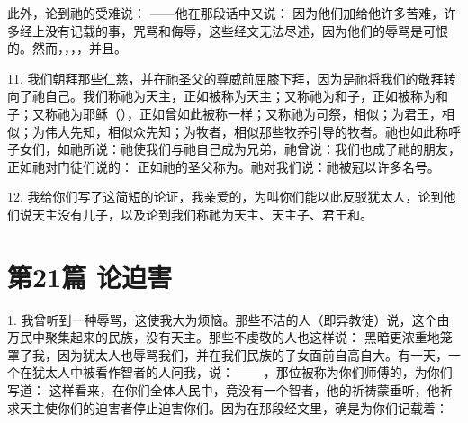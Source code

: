 此外，论到祂的受难说： ——他在那段话中又说： 因为他们加给他许多苦难，许多经上没有记载的事，咒骂和侮辱，这些经文无法尽述，因为他们的辱骂是可恨的。然而，，，，并且。\par

11. 我们朝拜那些仁慈，并在祂圣父的尊威前屈膝下拜，因为是祂将我们的敬拜转向了祂自己。我们称祂为天主，正如被称为天主；又称祂为和子，正如被称为和子；又称祂为耶稣（），正如曾如此被称一样；又称祂为司祭，相似；为君王，相似；为伟大先知，相似众先知；为牧者，相似那些牧养引导的牧者。祂也如此称呼子女们，如祂所说：祂使我们与祂自己成为兄弟，祂曾说：我们也成了祂的朋友，正如祂对门徒们说的： 正如祂的圣父称为。祂对我们说：祂被冠以许多名号。\par

12. 我给你们写了这简短的论证，我亲爱的，为叫你们能以此反驳犹太人，论到他们说天主没有儿子，以及论到我们称祂为天主、天主子、君王和。\par



\section{第21篇 论迫害}

1. 我曾听到一种辱骂，这使我大为烦恼。那些不洁的人（即异教徒）说，这个由万民中聚集起来的民族，没有天主。那些不虔敬的人也这样说： 黑暗更浓重地笼罩了我，因为犹太人也辱骂我们，并在我们民族的子女面前自高自大。有一天，一个在犹太人中被看作智者的人问我，说：—— ，那位被称为你们师傅的，为你们写道： 这样看来，在你们全体人民中，竟没有一个智者，他的祈祷蒙垂听，他祈求天主使你们的迫害者停止迫害你们。因为在那段经文里，确是为你们记载着：\par


